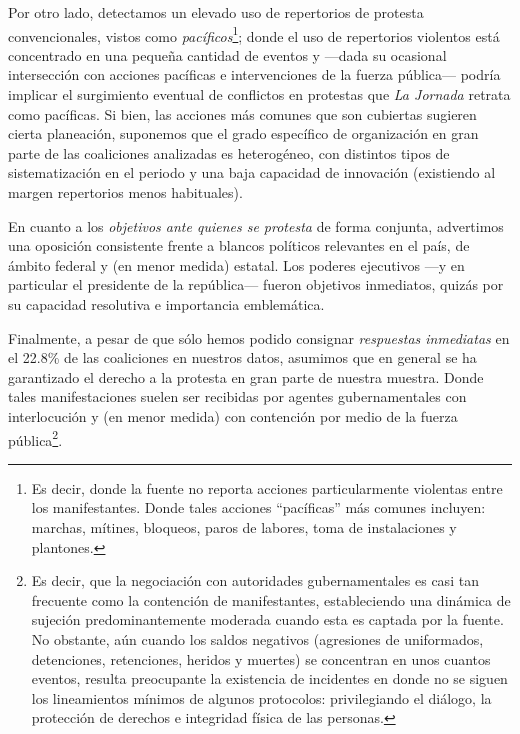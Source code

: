 \documentclass[letterpaper, 11pt]{book}
\theoremstyle{definition}
\theoremstyle{remark}
\begin{document}
Por otro lado, detectamos un elevado uso de repertorios de protesta convencionales, vistos como \emph{pacíficos}\footnote{
    Es decir, donde la fuente no reporta acciones particularmente violentas entre los manifestantes. 
    Donde tales acciones ``pacíficas'' más comunes incluyen: marchas, mítines, bloqueos, paros de labores, toma de instalaciones y plantones.
}; 
donde el uso de repertorios violentos está concentrado en una pequeña cantidad de eventos y ---dada su ocasional intersección con acciones pacíficas e intervenciones de la fuerza pública--- %
podría implicar el surgimiento eventual de conflictos en protestas que \emph{La Jornada} retrata como pacíficas. 
Si bien, las acciones más comunes que son cubiertas sugieren cierta planeación, suponemos que el grado específico de organización en gran parte de las coaliciones analizadas es heterogéneo, con distintos tipos de sistematización en el periodo y una baja capacidad de innovación (existiendo al margen repertorios menos habituales). 


En cuanto a los \emph{objetivos ante quienes se protesta} de forma conjunta, advertimos una oposición consistente frente a blancos políticos relevantes en el país, de ámbito federal y (en menor medida) estatal. 
Los poderes ejecutivos ---y en particular el presidente de la república--- fueron objetivos inmediatos, quizás por su capacidad resolutiva e importancia emblemática. 


Finalmente, a pesar de que sólo hemos podido consignar \emph{respuestas inmediatas} en el 22.8\% de las coaliciones en nuestros datos, asumimos que en general se ha garantizado el derecho a la protesta en gran parte de nuestra muestra. 
Donde tales manifestaciones suelen ser recibidas por agentes gubernamentales con interlocución y (en menor medida) con contención por medio de la fuerza pública\footnote{ 
    Es decir, que la negociación con autoridades gubernamentales es casi tan frecuente como la contención de manifestantes, estableciendo una dinámica de sujeción predominantemente moderada cuando esta es captada por la fuente. 
    No obstante, aún cuando los saldos negativos (agresiones de uniformados, detenciones, retenciones, heridos y muertes) se concentran en unos cuantos eventos, resulta preocupante la existencia de incidentes en donde no se siguen los lineamientos mínimos de algunos protocolos: privilegiando el diálogo, la protección de derechos e integridad física de las personas.
}.
\end{document}
